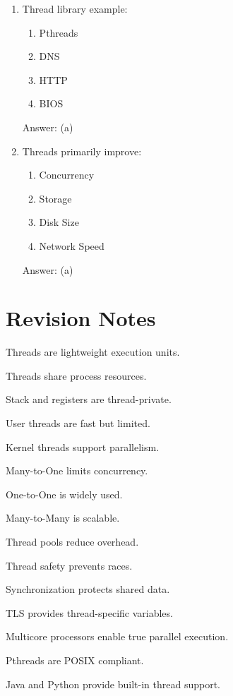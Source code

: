 \begin{enumerate}
\item Thread library example:
\begin{enumerate}[label=(\alph*)]
\item Pthreads
\item DNS
\item HTTP
\item BIOS
\end{enumerate}
Answer: (a)

\item Threads primarily improve:
\begin{enumerate}[label=(\alph*)]
\item Concurrency
\item Storage
\item Disk Size
\item Network Speed
\end{enumerate}
Answer: (a)
\end{enumerate}

\section{Revision Notes}

\begin{revisionnotes}
\item Threads are lightweight execution units.
\item Threads share process resources.
\item Stack and registers are thread-private.
\item User threads are fast but limited.
\item Kernel threads support parallelism.
\item Many-to-One limits concurrency.
\item One-to-One is widely used.
\item Many-to-Many is scalable.
\item Thread pools reduce overhead.
\item Thread safety prevents races.
\item Synchronization protects shared data.
\item TLS provides thread-specific variables.
\item Multicore processors enable true parallel execution.
\item Pthreads are POSIX compliant.
\item Java and Python provide built-in thread support.
\end{revisionnotes}

